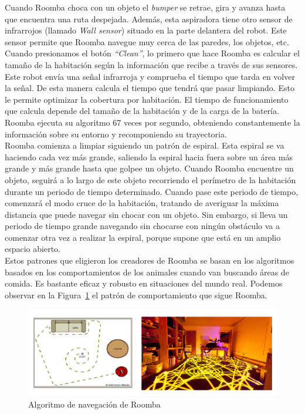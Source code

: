 Cuando Roomba choca con un objeto el \textit{bumper} se retrae, gira y avanza hasta que encuentra una ruta despejada. Además, esta aspiradora tiene otro sensor de infrarrojos (llamado \textit{Wall sensor}) situado en la parte delantera del robot. Este sensor permite que Roomba navegue muy cerca de las paredes, los objetos, etc. \\

Cuando presionamos el botón \textit{``Clean''}, lo primero que hace Roomba es calcular el tamaño de la habitación según la información que recibe a través de sus sensores. Este robot envía una señal infrarroja y comprueba el tiempo que tarda en volver la señal. De esta manera calcula el tiempo que tendrá que pasar limpiando. Esto le permite optimizar la cobertura por habitación. El tiempo de funcionamiento que calcula depende del tamaño de la habitación y de la carga de la batería. \\

Roomba ejecuta su algoritmo 67 veces por segundo, obteniendo constantemente la información sobre su entorno y recomponiendo su trayectoria.\\

Roomba comienza a limpiar siguiendo un patrón de espiral. Esta espiral se va haciendo cada vez más grande, saliendo la espiral hacia fuera sobre un área más grande y más grande hasta que golpee un objeto. Cuando Roomba encuentre un objeto, seguirá a lo largo de este objeto recorriendo el perímetro de la habitación durante un periodo de tiempo determinado. Cuando pase este periodo de tiempo, comenzará el modo cruce de la habitación, tratando de averiguar la máxima distancia que puede navegar sin chocar con un objeto. Sin embargo, si lleva un periodo de tiempo grande navegando sin chocarse con ningún obstáculo va a comenzar otra vez a realizar la espiral, porque supone que está en un amplio espacio abierto.\\

Estos patrones que eligieron los creadores de Roomba se basan en los algoritmos basados en los comportamientos de los animales cuando van buscando áreas de comida. Es bastante eficaz y robusto en situaciones del mundo real. Podemos observar en la Figura~\ref{fig.Algoritmo_roomba} el patrón de comportamiento que sigue Roomba.\\

\begin{figure}[H]
  \begin{center}
    \includegraphics[width=1\textwidth]{figures/Vacuum/Algoritmo_roomba.png}
		\caption{Algoritmo de navegación de Roomba}
		\label{fig.Algoritmo_roomba}
		\end{center}
\end{figure}

